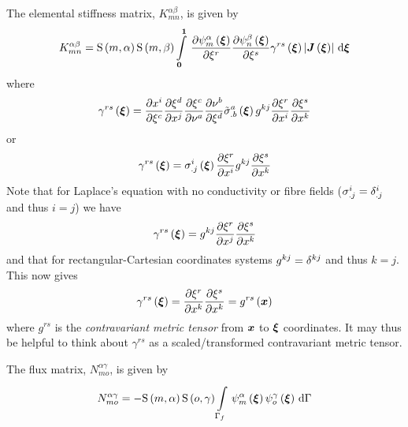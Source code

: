 The elemental stiffness matrix, $K^{\alpha\beta}_{mn}$, is given by
\begin{equation}
  K^{\alpha\beta}_{mn}=\gsf{m}{\alpha}\gsf{m}{\beta}
  \gint{\vectr{0}}{\vectr{1}}{\delby{\gbfn{m}{\alpha}{\vectr{\xi}}}{\xi^{r}}
    \delby{\gbfn{n}{\beta}{\vectr{\xi}}}{\xi^{s}}\fnof{\gamma^{rs}}{\vectr{\xi}}
    \abs{\fnof{\matr{J}}{\vectr{\xi}}}}{\vectr{\xi}}
  \label{eqn:elementalfemlhs2}
\end{equation}
where
\begin{equation}
  \fnof{\gamma^{rs}}{\vectr{\xi}}=\delby{x^{i}}{\xi^{c}}
  \delby{\xi^{d}}{x^{j}}\delby{\xi^{c}}{\nu^{a}}\delby{\nu^{b}}{\xi^{d}}
  \fnof{{\tilde{\conductivitytensorsymbol}}^{a}_{.b}}{\vectr{\xi}}\generalmetrictensorsymbol^{kj}
  \delby{\xi^{r}}{x^{i}}\delby{\xi^{s}}{x^{k}}
  \label{eqn:diffusiongammadefinition1}
\end{equation}
or
\begin{equation}
   \gamma^{rs}\left(  \boldsymbol{\xi}  \right) =  \sigma ^{i}_{.j}\left(  \boldsymbol{\xi}  \right)  \dfrac{\partial \xi^{r}}{\partial x^{i}} 
   g ^{kj} \dfrac{\partial \xi^{s}}{\partial x^{k}} 
\end{equation}
Note that for Laplace's equation with no conductivity or fibre fields
(\ie $ \sigma ^{i}_{.j}=  \delta ^{i}_{.j} $ and thus $i=j$) we
  have
\begin{equation}
  \fnof{\gamma^{rs}}{\vectr{\xi}}=\generalmetrictensorsymbol^{kj}\delby{\xi^{r}}{x^{j}}\delby{\xi^{s}}{x^{k}}
  \label{eqn:diffusiongammadefinition2}
\end{equation}
and that for rectangular-Cartesian coordinates systems
$ g ^{kj}=   \delta ^{{k}{j}}  $ and thus $k=j$. This now gives
\begin{equation}
  \fnof{\gamma^{rs}}{\vectr{\xi}}=\delby{\xi^{r}}{x^{k}}\delby{\xi^{s}}{x^{k}}=\fnof{g^{rs}}{\vectr{x}}
  \label{eqn:diffusiongammadefinition3}
\end{equation}
where $g^{rs}$ is the \emph{contravariant metric tensor} from $ \boldsymbol{x} $ to
$ \boldsymbol{\xi} $ coordinates. It may thus be helpful to think about $\gamma^{rs}$
as a scaled/transformed contravariant metric tensor.

The flux matrix, $N^{\alpha\gamma}_{mo}$, is given by
\begin{equation}
  N^{\alpha\gamma}_{mo} = -\gsf{m}{\alpha}\gsf{o}{\gamma}
  \gint{\Gamma_{f}}{}{\gbfn{m}{\alpha}{\vectr{\xi}}\gbfn{o}{\gamma}{\vectr{\xi}}}{\Gamma}
\end{equation}


